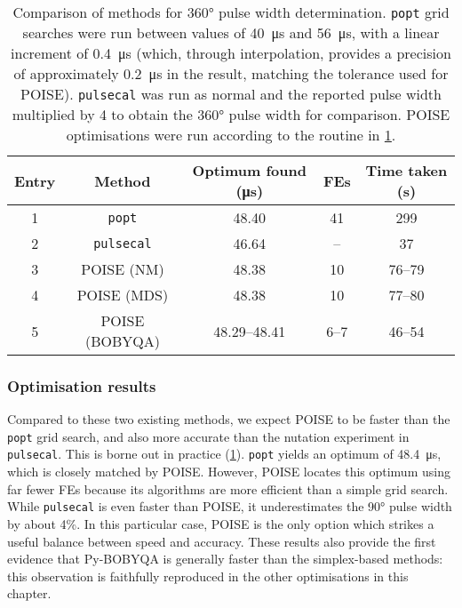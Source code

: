 \begin{table}[htb]
    \centering
    \begin{tabular}{ccccc}
        \toprule
        Entry & Method & Optimum found (\si{\us}) & FEs & Time taken (\si{\s}) \\
        \midrule
        1  & \texttt{popt}      & 48.40        & 41   & 299    \\
        2  & \texttt{pulsecal}  & 46.64        & --   & 37     \\
        3 & POISE (NM)         & 48.38        & 10   & 76--79 \\
        4 & POISE (MDS)        & 48.38        & 10   & 77--80 \\
        5 & POISE (BOBYQA)  & 48.29--48.41 & 6--7 & 46--54 \\
        \bottomrule
    \end{tabular}
    \caption[Comparison of methods for \ang{360} pulse width determination]{
        Comparison of methods for \ang{360} pulse width determination.
        \texttt{popt} grid searches were run between values of \SI{40}{\us} and \SI{56}{\us}, with a linear increment of \SI{0.4}{\us} (which, through interpolation, provides a precision of approximately \SI{0.2}{\us} in the result, matching the tolerance used for POISE).
        \texttt{pulsecal} was run as normal and the reported pulse width multiplied by 4 to obtain the \ang{360} pulse width for comparison.
        POISE optimisations were run according to the routine in \cref{tbl:poisecal_48}.
    }
    \label{tbl:poisecal_48}
\end{table}


\subsubsection{Optimisation results}

Compared to these two existing methods, we expect POISE to be faster than the \texttt{popt} grid search, and also more accurate than the nutation experiment in \texttt{pulsecal}.
This is borne out in practice (\cref{tbl:poisecal_48}).
\texttt{popt} yields an optimum of \SI{48.4}{\us}, which is closely matched by POISE.
However, POISE locates this optimum using far fewer FEs because its algorithms are more efficient than a simple grid search.
While \texttt{pulsecal} is even faster than POISE, it underestimates the \ang{90} pulse width by about 4\%.
In this particular case, POISE is the only option which strikes a useful balance between speed and accuracy.
These results also provide the first evidence that Py-BOBYQA is generally faster than the simplex-based methods: this observation is faithfully reproduced in the other optimisations in this chapter.


